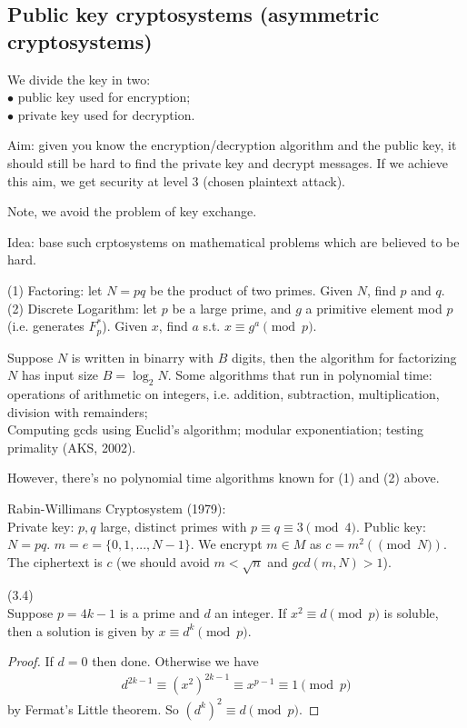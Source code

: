 \documentclass[a4paper]{article}
\begin{document}
\subsection{Public key cryptosystems (asymmetric cryptosystems)}
We divide the key in two:\\
$\bullet$ public key used for encryption;\\
$\bullet$ private key used for decryption.

Aim: given you know the encryption/decryption algorithm and the public key, it should still be hard to find the private key and decrypt messages. If we achieve this aim, we get security at level 3 (chosen plaintext attack).

Note, we avoid the problem of key exchange.

Idea: base such crptosystems on mathematical problems which are believed to be hard.

(1) Factoring: let $N=pq$ be the product of two primes. Given $N$, find $p$ and $q$.
(2) Discrete Logarithm: let $p$ be a large prime, and $g$ a primitive element mod $p$ (i.e. generates $F_p^*$). Given $x$, find $a$ s.t. $x \equiv g^a \pmod p$.

Suppose $N$ is written in binarry with $B$ digits, then the algorithm for factorizing $N$ has input size $B = \log_2 N$. Some algorithms that run in polynomial time:\\
operations of arithmetic on integers, i.e. addition, subtraction, multiplication, division with remainders;\\
Computing gcds using Euclid's algorithm; modular exponentiation; testing primality (AKS, 2002).

However, there's no polynomial time algorithms known for (1) and (2) above.

Rabin-Willimans Cryptosystem (1979):\\
Private key: $p,q$ large, distinct primes with $p \equiv q \equiv 3 \pmod 4$. Public key: $N=pq$. $m=e=\{0,1,...,N-1\}$. We encrypt $m \in M$ as $c = m^2 (\pmod N)$. The ciphertext is $c$ (we should avoid $m < \sqrt{n}$ and $gcd(m,N)>1$).

\begin{lemma} (3.4)\\
Suppose $p=4k-1$ is a prime and $d$ an integer. If $x^2 \equiv d \pmod p$ is soluble, then a solution is given by $x\equiv d^k \pmod p$.
\begin{proof}
If $d=0$ then done. Otherwise we have
\begin{equation*}
\begin{aligned}
d^{2k-1} \equiv (x^2)^{2k-1} \equiv x^{p-1} \equiv 1 \pmod p
\end{aligned}
\end{equation*}
by Fermat's Little theorem. So $(d^k)^2 \equiv d \pmod p$.
\end{proof}
\end{lemma}
\end{document}
